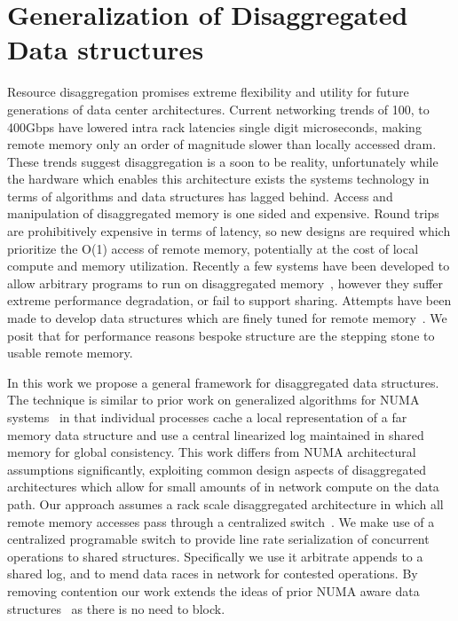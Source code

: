 \section{Generalization of Disaggregated Data structures}

Resource disaggregation promises extreme flexibility and utility for future
generations of data center architectures. Current networking trends of 100, to
400Gbps have lowered intra rack latencies single digit microseconds, making
remote memory only an order of magnitude slower than locally accessed dram.
These trends suggest disaggregation is a soon to be reality, unfortunately while
the hardware which enables this architecture exists the systems technology in
terms of algorithms and data structures has lagged behind. Access and
manipulation of disaggregated memory is one sided and expensive. Round trips are
prohibitively expensive in terms of latency, so new designs are required which
prioritize the O(1) access of remote memory, potentially at the cost of local
compute and memory utilization. Recently a few systems have been developed to
allow arbitrary programs to run on disaggregated
memory~\cite{legoos,leap,fastswap,reigons}, however they suffer extreme
performance degradation, or fail to support sharing.  Attempts have been made to
develop data structures which are finely tuned for remote
memory~\cite{clover,one-sided-hash,sherman}. We posit that for performance
reasons bespoke structure are the stepping stone to usable remote memory.

In this work we propose a general framework for disaggregated data structures.
The technique is similar to prior work on generalized algorithms for NUMA
systems~\cite{black-box-numa} in that individual processes cache a local
representation of a far memory data structure and use a central linearized log
maintained in shared memory for global consistency. This work differs from NUMA
architectural assumptions significantly, exploiting common design aspects of
disaggregated architectures which allow for small amounts of in network compute
on the data path. Our approach assumes a rack scale disaggregated architecture
in which all remote memory accesses pass through a centralized
switch~\cite{disandapp,Grant2021InContRes}. We make use of a centralized
programable switch to provide line rate serialization of concurrent operations
to shared structures. Specifically we use it arbitrate appends to a shared log,
and to mend data races in network for contested operations. By removing
contention our work extends the ideas of prior NUMA aware data
structures~\cite{black-box-numa} as there is no need to block.

